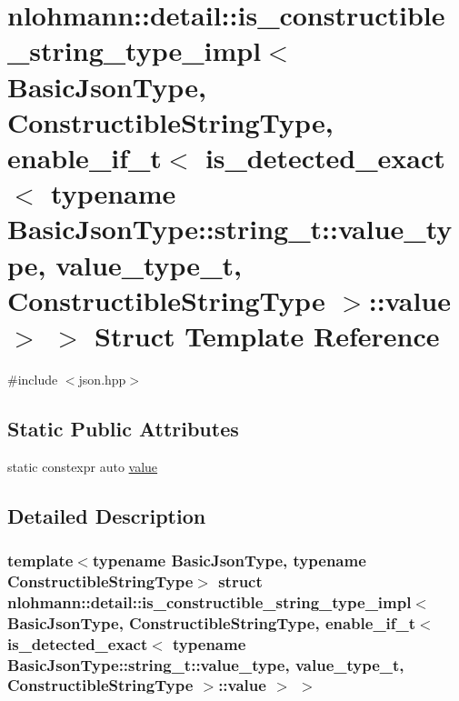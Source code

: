 \hypertarget{structnlohmann_1_1detail_1_1is__constructible__string__type__impl_3_01_basic_json_type_00_01_con83e8ebfe9593f851a60fdb8360df1512}{}\section{nlohmann\+::detail\+::is\+\_\+constructible\+\_\+string\+\_\+type\+\_\+impl$<$ Basic\+Json\+Type, Constructible\+String\+Type, enable\+\_\+if\+\_\+t$<$ is\+\_\+detected\+\_\+exact$<$ typename Basic\+Json\+Type\+::string\+\_\+t\+::value\+\_\+type, value\+\_\+type\+\_\+t, Constructible\+String\+Type $>$\+::value $>$ $>$ Struct Template Reference}
\label{structnlohmann_1_1detail_1_1is__constructible__string__type__impl_3_01_basic_json_type_00_01_con83e8ebfe9593f851a60fdb8360df1512}


{\ttfamily \#include $<$json.\+hpp$>$}

\subsection*{Static Public Attributes}
\begin{DoxyCompactItemize}
\item 
static constexpr auto \mbox{\hyperlink{structnlohmann_1_1detail_1_1is__constructible__string__type__impl_3_01_basic_json_type_00_01_con83e8ebfe9593f851a60fdb8360df1512_a3aeae0de0fc37bd5acf3c9d39b132678}{value}}
\end{DoxyCompactItemize}


\subsection{Detailed Description}
\subsubsection*{template$<$typename Basic\+Json\+Type, typename Constructible\+String\+Type$>$\newline
struct nlohmann\+::detail\+::is\+\_\+constructible\+\_\+string\+\_\+type\+\_\+impl$<$ Basic\+Json\+Type, Constructible\+String\+Type, enable\+\_\+if\+\_\+t$<$ is\+\_\+detected\+\_\+exact$<$ typename Basic\+Json\+Type\+::string\+\_\+t\+::value\+\_\+type, value\+\_\+type\+\_\+t, Constructible\+String\+Type $>$\+::value $>$ $>$}



